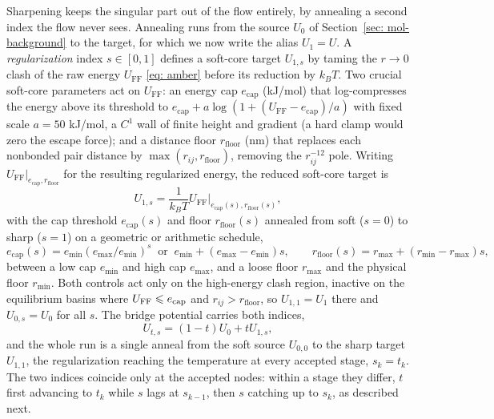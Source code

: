 \documentclass{article}
\begin{document}
Sharpening keeps the singular part out of the flow entirely, by annealing a second index the flow never sees. Annealing runs from the source $U_0$ of Section~\ref{sec: mol-background} to the target, for which we now write the alias $U_1 = U$. A \emph{regularization} index $s \in [0,1]$ defines a soft-core target $U_{1,s}$ by taming the $r \to 0$ clash of the raw energy $U_{\mathrm{FF}}$ \eqref{eq: amber} before its reduction by $k_B T$. Two crucial soft-core parameters act on $U_{\mathrm{FF}}$: an energy cap $e_{\mathrm{cap}}$ (kJ/mol) that log-compresses the energy above its threshold to $e_{\mathrm{cap}} + a \log(1 + (U_{\mathrm{FF}} - e_{\mathrm{cap}})/a)$ with fixed scale $a = 50$ kJ/mol, a $C^1$ wall of finite height and gradient (a hard clamp would zero the escape force); and a distance floor $r_{\mathrm{floor}}$ (nm) that replaces each nonbonded pair distance by $\max(r_{ij}, r_{\mathrm{floor}})$, removing the $r_{ij}^{-12}$ pole. Writing $U_{\mathrm{FF}}\big|_{e_{\mathrm{cap}}, r_{\mathrm{floor}}}$ for the resulting regularized energy, the reduced soft-core target is
\begin{equation}
    U_{1,s} = \frac{1}{k_B T} U_{\mathrm{FF}}\big|_{e_{\mathrm{cap}}(s), r_{\mathrm{floor}}(s)},
    \label{eq: softcore}
\end{equation}
with the cap threshold $e_{\mathrm{cap}}(s)$ and floor $r_{\mathrm{floor}}(s)$ annealed from soft ($s=0$) to sharp ($s=1$) on a geometric or arithmetic schedule,
\begin{equation*}
    e_{\mathrm{cap}}(s) = e_{\min}(e_{\max}/e_{\min})^{s} \ \text{ or }\ e_{\min} + (e_{\max}-e_{\min})s, \qquad
    r_{\mathrm{floor}}(s) = r_{\max} + (r_{\min}-r_{\max})s,
\end{equation*}
between a low cap $e_{\min}$ and high cap $e_{\max}$, and a loose floor $r_{\max}$ and the physical floor $r_{\min}$. Both controls act only on the high-energy clash region, inactive on the equilibrium basins where $U_{\mathrm{FF}} \leqslant e_{\mathrm{cap}}$ and $r_{ij} > r_{\mathrm{floor}}$, so $U_{1,1} = U_1$ there and $U_{0,s} = U_0$ for all $s$. The bridge potential carries both indices,
\begin{equation*}
    U_{t,s} = (1-t)U_0 + t U_{1,s},
\end{equation*}
and the whole run is a single anneal from the soft source $U_{0,0}$ to the sharp target $U_{1,1}$, the regularization reaching the temperature at every accepted stage, $s_k = t_k$. The two indices coincide only at the accepted nodes: within a stage they differ, $t$ first advancing to $t_k$ while $s$ lags at $s_{k-1}$, then $s$ catching up to $s_k$, as described next.
\end{document}
